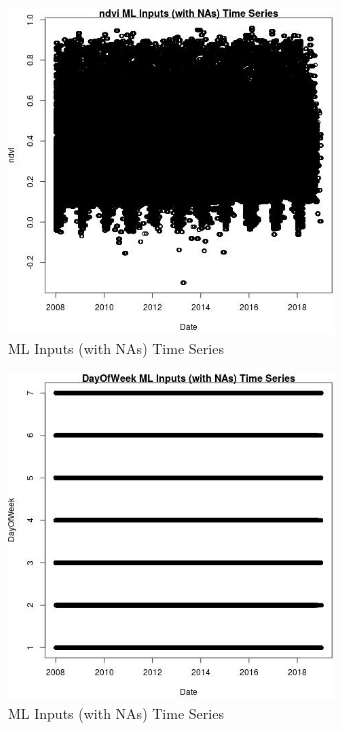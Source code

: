 \begin{figure} 
\centering  
\includegraphics[width=0.77\textwidth]{Code_Outputs/Report_ML_input_PM25_Step4_part_e_de_duplicated_aves_compiled_2019-05-21wNAs_ndvivDate.jpg} 
\caption{\label{fig:Report_ML_input_PM25_Step4_part_e_de_duplicated_aves_compiled_2019-05-21wNAsndvivDate}ML Inputs (with NAs) Time Series} 
\end{figure} 
 

\clearpage 

\begin{figure} 
\centering  
\includegraphics[width=0.77\textwidth]{Code_Outputs/Report_ML_input_PM25_Step4_part_e_de_duplicated_aves_compiled_2019-05-21wNAs_DayOfWeekvDate.jpg} 
\caption{\label{fig:Report_ML_input_PM25_Step4_part_e_de_duplicated_aves_compiled_2019-05-21wNAsDayOfWeekvDate}ML Inputs (with NAs) Time Series} 
\end{figure} 
 


